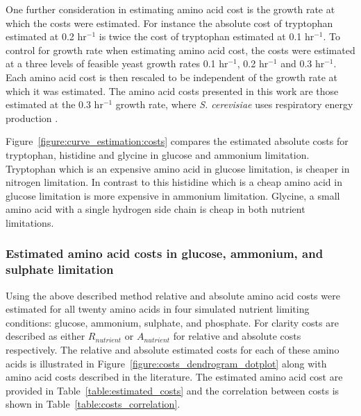 One further consideration in estimating amino acid cost is the growth rate at which the costs were estimated. For instance the absolute cost of tryptophan estimated at 0.2 hr$^{-1}$ is twice the cost of tryptophan estimated at 0.1 hr$^{-1}$. To control for growth rate when estimating amino acid cost, the costs were estimated at a three levels of feasible yeast growth rates 0.1 hr$^{-1}$, 0.2 hr$^{-1}$ and 0.3 hr$^{-1}$. Each amino acid cost is then rescaled to be independent of the growth rate at which it was estimated. The amino acid costs presented in this work are those estimated at the 0.3 hr$^{-1}$ growth rate, where \emph{S. cerevisiae} uses respiratory energy production \cite{famili2003}.

Figure~\ref{figure:curve_estimation:costs} compares the estimated absolute costs for tryptophan, histidine and glycine in glucose and ammonium limitation. Tryptophan which is an expensive amino acid in glucose limitation, is cheaper in nitrogen limitation. In contrast to this histidine which is a cheap amino acid in glucose limitation is more expensive in ammonium limitation. Glycine, a small amino acid with a single hydrogen side chain is cheap in both nutrient limitations.

\subsubsection{Estimated amino acid costs in glucose, ammonium, and sulphate limitation}%

Using the above described method relative and absolute amino acid costs were estimated for all twenty amino acids in four simulated nutrient limiting conditions: glucose, ammonium, sulphate, and phosphate. For clarity costs are described as either $R_{nutrient}$ or $A_{nutrient}$ for relative and absolute costs respectively. The relative and absolute estimated costs for each of these amino acids is illustrated in Figure~\vref{figure:costs_dendrogram_dotplot} along with amino acid costs described in the literature. The estimated amino acid cost are provided in Table~\vref{table:estimated_costs} and the correlation between costs is shown in Table~\vref{table:costs_correlation}.

